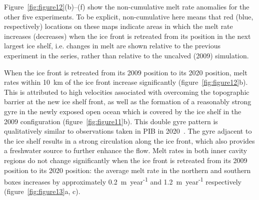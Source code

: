 \documentclass[draft]{agujournal2019}
\begin{document}
Figure~\ref{fig:figure12}(b)--(f) show the non-cumulative melt rate anomalies for the other five experiments. To be explicit, non-cumulative here means that red (blue, respectively) locations on these maps indicate areas in which the melt rate increases (decreases) when the ice front is retreated from its position in the next largest ice shelf, i.e. changes in melt are shown relative to the previous experiment in the series, rather than relative to the uncalved (2009) simulation.

When the ice front is retreated from its 2009 position to its 2020 position, melt rates within 10~km of the ice front increase significantly (figure~\ref{fig:figure12}b). This is attributed to high velocities associated with overcoming the topographic barrier at the new ice shelf front, as well as the formation of a reasonably strong gyre in the newly exposed open ocean which is covered by the ice shelf in the 2009 configuration (figure~\ref{fig:figure11}b). This double gyre pattern is qualitatively similar to observations taken in PIB in 2020~\cite{Yoon2022NatureComms}. The gyre adjacent to the ice shelf results in a strong circulation along the ice front, which also provides a freshwater source to further enhance the flow. Melt rates in both inner cavity regions do not change significantly when the ice front is retreated from its 2009 position to its 2020 position: the average melt rate in the northern and southern boxes increases by approximately 0.2~m~year\textsuperscript{-1} and 1.2~m~year\textsuperscript{-1} respectively (figure~\ref{fig:figure13}a, c).
\end{document}
